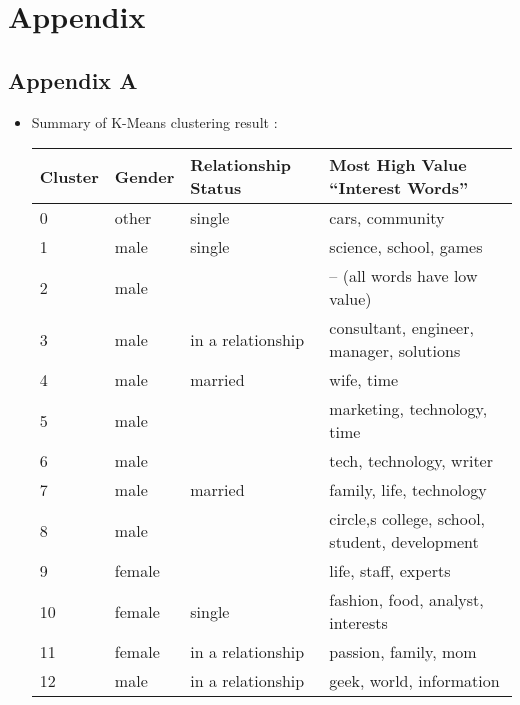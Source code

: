 \section{Appendix}
\subsection*{Appendix A}
\begin{itemize}
	\item Summary of K-Means clustering result : 
	\begin{table}[H]
    \begin{tabular}{|l|l|l|l|}
    \hline
    Cluster & Gender & Relationship Status & Most High Value “Interest Words”               \\ \hline
    0       & other  & single              & cars, community                                \\ \hline
    1       & male   & single              & science, school, games                         \\ \hline
    2       & male   & ~                   & -- (all words have low value)                  \\ \hline
    3       & male   & in a relationship   & consultant, engineer, manager, solutions       \\ \hline
    4       & male   & married             & wife, time                                     \\ \hline
    5       & male   & ~                   & marketing, technology, time                    \\ \hline
    6       & male   & ~                   & tech, technology, writer                       \\ \hline
    7       & male   & married             & family, life, technology                       \\ \hline
    8       & male   & ~                   & circle,s college, school, student, development \\ \hline
    9       & female & ~                   & life, staff, experts                           \\ \hline
    10      & female & single              & fashion, food, analyst, interests              \\ \hline
    11      & female & in a relationship   & passion, family, mom                           \\ \hline
    12      & male   & in a relationship   & geek, world, information                       \\ \hline

\end{tabular}
\end{table}
\end{itemize}
